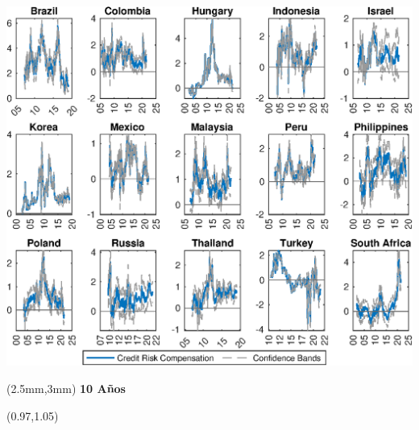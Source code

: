 \documentclass[12pt, aspectratio=169, xcolor=dvipsnames]{beamer}
\begin{document}
\begin{frame}[label=crcCI]
\begin{center}							%
\includegraphics[trim={0cm 0cm 0cm 0cm},clip,height=0.95\textheight,width=\linewidth]{../Figures/Estimation/bsl_cr_CI_10y_V1.eps} \\
\end{center}
\begin{textblock*}{15cm}(2.5mm,3mm)
	\textbf{10 Años}
\end{textblock*}
\begin{textblock*}{5cm}(0.97\textwidth,1.05\textheight)
\hyperlink{YldDcmp10}{}
\end{textblock*}
\end{frame}

\end{document}
